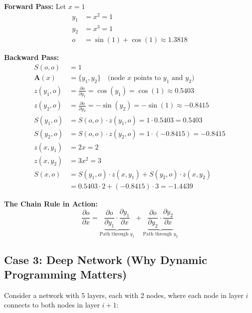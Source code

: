 \begin{notechapter}
\textbf{Forward Pass:} Let $x = 1$
\begin{align*}
y_1 &= x^2 = 1\\
y_2 &= x^3 = 1\\
o &= \sin(1) + \cos(1) \approx 1.3818
\end{align*}

\textbf{Backward Pass:}
\begin{align*}
S(o,o) &= 1\\
\mathbf{A}(x) &= \{y_1, y_2\} \quad \text{(node $x$ points to $y_1$ and $y_2$)}\\[0.3em]
z(y_1,o) &= \frac{\partial o}{\partial y_1} = \cos(y_1) = \cos(1) \approx 0.5403\\
z(y_2,o) &= \frac{\partial o}{\partial y_2} = -\sin(y_2) = -\sin(1) \approx -0.8415\\[0.3em]
S(y_1,o) &= S(o,o) \cdot z(y_1,o) = 1 \cdot 0.5403 = 0.5403\\
S(y_2,o) &= S(o,o) \cdot z(y_2,o) = 1 \cdot (-0.8415) = -0.8415\\[0.3em]
z(x,y_1) &= 2x = 2\\
z(x,y_2) &= 3x^2 = 3\\[0.3em]
S(x,o) &= S(y_1,o) \cdot z(x,y_1) + S(y_2,o) \cdot z(x,y_2)\\
&= 0.5403 \cdot 2 + (-0.8415) \cdot 3 = \boxed{-1.4439}
\end{align*}

\textbf{The Chain Rule in Action:}
$$\frac{\partial o}{\partial x} = \underbrace{\frac{\partial o}{\partial y_1} \cdot \frac{\partial y_1}{\partial x}}_{\text{Path through } y_1} + \underbrace{\frac{\partial o}{\partial y_2} \cdot \frac{\partial y_2}{\partial x}}_{\text{Path through } y_2}$$

\subsection{Case 3: Deep Network (Why Dynamic Programming Matters)}

\begin{example}
Consider a network with 5 layers, each with 2 nodes, where each node in layer $i$ connects to both nodes in layer $i+1$:
\end{example}

\begin{center}
\end{center}
\end{notechapter}
